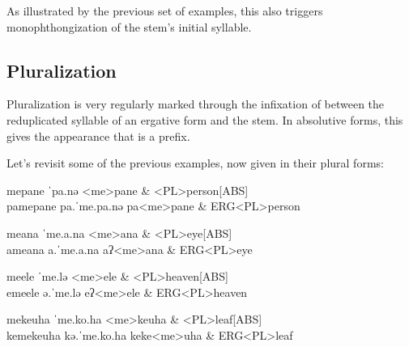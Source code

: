 As illustrated by the previous set of examples, this also triggers mono\-phthongization of the stem's initial syllable.

\subsection{Pluralization}\label{sec:pluralization}
Pluralization is very regularly marked through the infixation of  between the reduplicated syllable of an ergative form and the stem. In absolutive forms, this gives the appearance that  is a prefix.

Let's revisit some of the previous examples, now given in their plural forms:

\begin{subexamples}
  \ex
    \preamble mepane
    \pronunciation ˈpa.nə
    \gloss
      <me>pane & <PL>person[ABS] \\
  \ex
    \preamble pamepane
    \pronunciation pa.ˈme.pa.nə
    \gloss
      pa\allo <me>pane & ERG\allo <PL>person \\
\end{subexamples}

\begin{subexamples}
  \ex
    \preamble meana
    \pronunciation ˈme.a.na
    \gloss
      <me>ana & <PL>eye[ABS] \\
  \ex
    \preamble ameana
    \pronunciation a.ˈme.a.na
    \gloss
      aʔ\allo <me>ana & ERG\allo <PL>eye \\
\end{subexamples}


\begin{subexamples}
  \label{ex:double-schwa}
  \ex
  \preamble meele
  \pronunciation ˈme.lə
  \gloss
    <me>ele & <PL>heaven[ABS] \\
  \ex
    \label{ex:double-schwa-erg}
    \preamble emeele
    \pronunciation ə.ˈme.lə
    \gloss
      eʔ\allo <me>ele & ERG\allo <PL>heaven \\
\end{subexamples}


\begin{subexamples}
  \ex
    \preamble mekeuha
    \pronunciation ˈme.ko.ha
    \gloss
      <me>keuha & <PL>leaf[ABS] \\
  \ex
    \preamble kemekeuha
    \pronunciation kə.ˈme.ko.ha
    \gloss
      ke\allo ke<me>uha & ERG\allo <PL>leaf \\
\end{subexamples}

